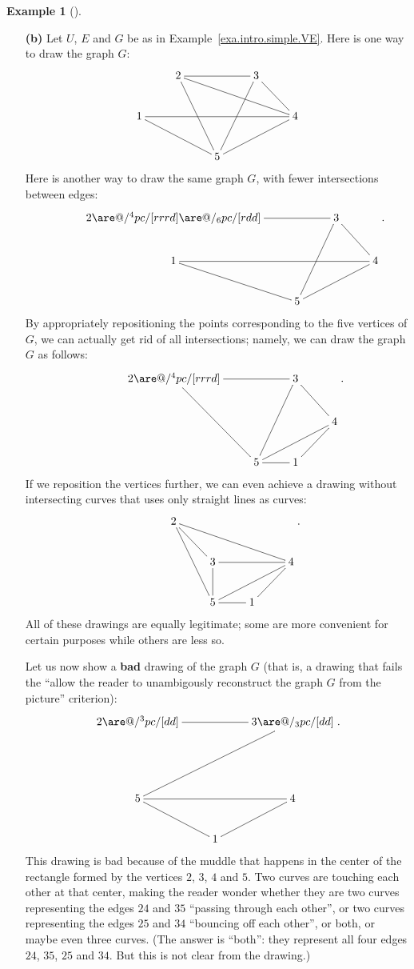 \documentclass[numbers=enddot,12pt,final,onecolumn,notitlepage]{scrartcl}%
\makeatletter
\theoremstyle{definition}
\newtheorem{exam}[theo]{Example}
\newenvironment{example}[1][]
{\begin{exam}[#1]\begin{leftbar}}
{\end{leftbar}\end{exam}}
\newcommand{\are}{\ar@{-}}
\makeatother
\begin{document}
\begin{example}
\begin{enumerate}
\item[\textbf{(b)}] Let $U$, $E$ and $G$ be as in
Example~\ref{exa.intro.simple.VE}. Here is one way to draw the graph
$G$:
\begin{align*}
\xymatrix{
& 2 \are[rr] \are[rrrd] \are[rdd] & & 3 \are[rd] \are[ldd] \\
1 \are[rrrr] \are[rrd] & & & & 4 \are[lld] \\
& & 5
}
\end{align*}
Here is another way to draw the same graph $G$, with fewer
intersections between edges:
\begin{align*}
\xymatrix{
& 2 \are[rr] \are@/^4pc/[rrrd] \are@/_6pc/[rdd] & & 3 \are[rd] \are[ldd] \\
& 1 \are[rrr] \are[rd] & & & 4 \are[lld] \\
& & 5
} .
\end{align*}
By appropriately repositioning the points corresponding to the five
vertices of $G$, we can actually get rid of all intersections; namely,
we can draw the graph $G$ as follows:
\begin{align*}
\xymatrix{
& 2 \are[rr] \are@/^4pc/[rrrd] \are[rdd] & & 3 \are[rd] \are[ldd] \\
& & & & 4 \are[lld] \\
& & 5 \are[r] & 1 \are[ru]
} .
\end{align*}
If we reposition the vertices further, we can even achieve a drawing
without intersecting curves that uses only straight lines as curves:
\begin{align*}
\xymatrix{
& 2 \are[rd] \are[rrrd] \are[rdd] \\
& & 3 \are[d] \are[rr] & & 4 \are[lld] \\
& & 5 \are[r] & 1 \are[ru]
} .
\end{align*}
All of these drawings are equally legitimate; some are more convenient
for certain purposes while others are less so.

Let us now show a \textbf{bad} drawing of the graph $G$ (that is, a
drawing that fails the ``allow the reader to
unambigously reconstruct the graph $G$ from the picture'' criterion):
\begin{align*}
\xymatrix{
2 \are[rr] \are@/^3pc/[dd] & & 3 \are@/_3pc/[dd] \are[lldd] \\
& \\
5 \are[rr] \are[rd] & & 4 \are[ld] \\
& 1
} .
\end{align*}
This drawing is bad because of the muddle that happens in the center
of the rectangle formed by the vertices $2$, $3$, $4$ and $5$. Two
curves are touching each other at that center, making the reader
wonder whether they are two curves representing the edges $24$ and
$35$ ``passing through each other'', or two curves representing the
edges $25$ and $34$ ``bouncing off each other'', or both, or maybe
even three curves. (The answer is ``both'': they represent all four
edges $24$, $35$, $25$ and $34$. But this is not clear from the
drawing.)


\end{enumerate}
\end{example}
\end{document}
